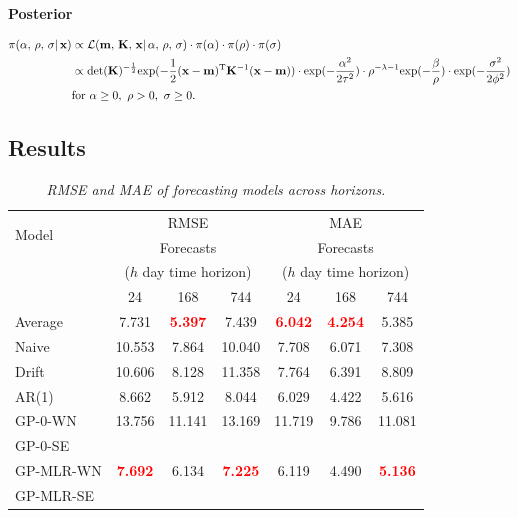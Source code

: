 \documentclass[a4paper, 10pt, fleqn]{article}
\begin{document}
\begin{flushleft}
         \textbf{Posterior}
         
         \begin{align*}
            \pi(\alpha,\, \rho,\, \sigma| \, \mathbf{x}) 
            & \propto \mathcal{L}(\mathbf{m},\, \mathbf{K},\, \mathbf{x}| \, \alpha,\, \rho,\, \sigma) 
            \cdot \pi(\alpha) 
            \cdot \pi(\rho) 
            \cdot \pi(\sigma)\\
            & \propto \text{det}(\mathbf{K})^{-\frac{1}{2}} 
            \text{exp} (-\frac{1}{2} (\mathbf{x} - \mathbf{m})^{\text{\text{T}}} \mathbf{K}^{-1} (\mathbf{x} - \mathbf{m}))
            \cdot \text{exp}(-\frac{\alpha^2}{2\tau^2}) 
            \cdot \rho^{-\lambda-1} \text{exp}(-\frac{\beta}{\rho}) 
            \cdot \text{exp}(-\frac{\sigma^2}{2\phi^2})\\
            & \text{for } \alpha \geq 0,\ \rho > 0,\ \sigma \geq 0.
         \end{align*}

      \subsection*{Results}

      \begin{table}[H]
         \centering
         \begin{tabular}{lcccccc}
         \hline
         \multirow{2}{*}{Model} & \multicolumn{3}{c}{RMSE} & \multicolumn{3}{c}{MAE} \\
         \cline{2-7}
         & \multicolumn{3}{c}{Forecasts} & \multicolumn{3}{c}{Forecasts} \\
         & \multicolumn{3}{c}{($h$ day time horizon)} & \multicolumn{3}{c}{($h$ day time horizon)} \\
         & 24 & 168 & 744 & 24 & 168 & 744 \\
         \hline
         Average & {7.731} & \textbf{\textcolor{red}{5.397}} & {7.439} & \textbf{\textcolor{red}{6.042}} & \textbf{\textcolor{red}{4.254}} & {5.385} \\
         Naive & {10.553} & {7.864} & {10.040} & {7.708} & {6.071} & {7.308} \\
         Drift & {10.606} & {8.128} & {11.358} & {7.764} & {6.391} & {8.809} \\
         AR(1) & {8.662} & {5.912} & {8.044} & {6.029} & {4.422} & {5.616} \\
         GP-0-WN & {13.756} & {11.141} & {13.169} & {11.719} & {9.786} & {11.081} \\
         GP-0-SE & {~} & {~} & {~} & {~} & {~} & {~} \\
         GP-MLR-WN & \textbf{\textcolor{red}{7.692}} & {6.134} & \textbf{\textcolor{red}{7.225}} & {6.119} & {4.490} & \textbf{\textcolor{red}{5.136}} \\
         GP-MLR-SE & {~} & {~} & {~} & {~} & {~} & {~} \\
         \hline
         \end{tabular}
         \caption{\textit{RMSE and MAE of forecasting models across horizons.}}
      \end{table}


\end{flushleft}
\end{document}
